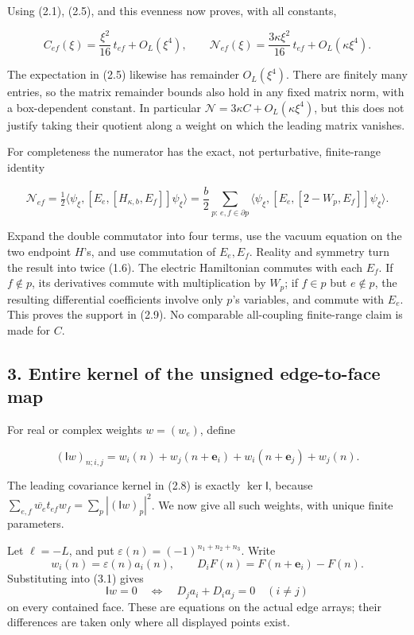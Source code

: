 \documentclass[
  11pt,
]{article}
\begin{document}
Using (2.1), (2.5), and this evenness now proves, with all constants,

\[
\boxed{
C_{ef}(\xi)=\frac{\xi^2}{16}\,t_{ef}+O_L(\xi^4),\qquad
\mathcal N_{ef}(\xi)=\frac{3\kappa\xi^2}{16}\,t_{ef}
+O_L(\kappa\xi^4).}
\tag{2.8}
\]

The expectation in (2.5) likewise has remainder \(O_L(\xi^4)\). There
are finitely many entries, so the matrix remainder bounds also hold in
any fixed matrix norm, with a box-dependent constant. In particular
\(\mathcal N=3\kappa C+O_L(\kappa\xi^4)\), but this does not justify
taking their quotient along a weight on which the leading matrix
vanishes.

For completeness the numerator has the exact, not perturbative,
finite-range identity

\[
\mathcal N_{ef}
=\tfrac12\langle\psi_\xi,[E_e,[H_{\kappa,b},E_f]]\psi_\xi\rangle
=\frac b2\sum_{p:\,e,f\in\partial p}
\langle\psi_\xi,[E_e,[2-W_p,E_f]]\psi_\xi\rangle.
\tag{2.9}
\]

Expand the double commutator into four terms, use the vacuum equation on
the two endpoint \(H\)'s, and use commutation of \(E_e,E_f\). Reality
and symmetry turn the result into twice (1.6). The electric Hamiltonian
commutes with each \(E_f\). If \(f\notin p\), its derivatives commute
with multiplication by \(W_p\); if \(f\in p\) but \(e\notin p\), the
resulting differential coefficients involve only \(p\)'s variables, and
commute with \(E_e\). This proves the support in (2.9). No comparable
all-coupling finite-range claim is made for \(C\).

\subsection{3. Entire kernel of the unsigned edge-to-face
map}\label{magnetic-part-4-entire-kernel-of-the-unsigned-edge-to-face-map}

For real or complex weights \(w=(w_e)\), define

\[
(\mathsf Iw)_{n;i,j}
=w_i(n)+w_j(n+\mathbf e_i)+w_i(n+\mathbf e_j)+w_j(n).
\tag{3.1}
\]

The leading covariance kernel in (2.8) is exactly \(\ker\mathsf I\),
because \(\sum_{e,f}\overline{w_e}t_{ef}w_f=\sum_p|(\mathsf Iw)_p|^2\).
We now give all such weights, with unique finite parameters.

Let \(\ell=-L\), and put \(\varepsilon(n)=(-1)^{n_1+n_2+n_3}\). Write \[
w_i(n)=\varepsilon(n)a_i(n),\qquad
D_iF(n)=F(n+\mathbf e_i)-F(n).
\tag{3.2}
\] Substituting into (3.1) gives \[
\mathsf Iw=0\quad\Longleftrightarrow\quad
D_ja_i+D_ia_j=0\quad (i\ne j)
\tag{3.3}
\] on every contained face. These are equations on the actual edge
arrays; their differences are taken only where all displayed points
exist.
\end{document}
